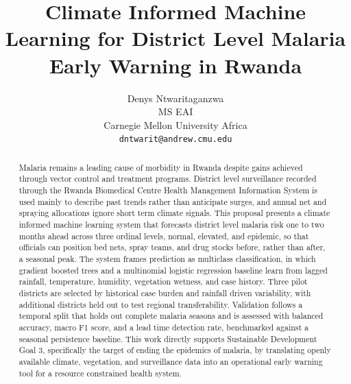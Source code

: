 \documentclass[11pt]{article}
\title{Climate Informed Machine Learning for District Level Malaria Early Warning in Rwanda}
\author{Denys Ntwaritaganzwa \\
  MS EAI \\
  Carnegie Mellon University Africa \\
  \texttt{dntwarit@andrew.cmu.edu}}
\begin{document}
\maketitle

\begin{abstract}
Malaria remains a leading cause of morbidity in Rwanda despite gains achieved through vector control and treatment programs. District level surveillance recorded through the Rwanda Biomedical Centre Health Management Information System is used mainly to describe past trends rather than anticipate surges, and annual net and spraying allocations ignore short term climate signals. This proposal presents a climate informed machine learning system that forecasts district level malaria risk one to two months ahead across three ordinal levels, normal, elevated, and epidemic, so that officials can position bed nets, spray teams, and drug stocks before, rather than after, a seasonal peak. The system frames prediction as multiclass classification, in which gradient boosted trees and a multinomial logistic regression baseline learn from lagged rainfall, temperature, humidity, vegetation wetness, and case history. Three pilot districts are selected by historical case burden and rainfall driven variability, with additional districts held out to test regional transferability. Validation follows a temporal split that holds out complete malaria seasons and is assessed with balanced accuracy, macro F1 score, and a lead time detection rate, benchmarked against a seasonal persistence baseline. This work directly supports Sustainable Development Goal 3, specifically the target of ending the epidemics of malaria, by translating openly available climate, vegetation, and surveillance data into an operational early warning tool for a resource constrained health system.
\end{abstract}
\end{document}
